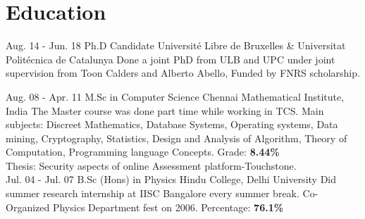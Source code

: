 \documentclass[]{cv-class}
\begin{document}
\section{Education}
\begin{entrylist}
  \entry
    {Aug. 14 - Jun. 18}
    {Ph.D Candidate}
    {Universit\'{e} Libre de Bruxelles \&  Universitat Polit\'{e}cnica de Catalunya}
   {Done a joint PhD from ULB and UPC under joint supervision from Toon Calders and Alberto Abello, Funded by FNRS scholarship.\\}

  \entry
    {Aug. 08 - Apr. 11}
    {M.Sc in Computer Science}
    {Chennai Mathematical Institute, India}
    {The Master course was done part time while working in TCS.
    Main subjects: Discreet Mathematics, Database Systems, Operating systems, Data mining, Cryptography, Statistics, Design and Analysis of Algorithm,
    Theory of Computation, Programming language Concepts. Grade: \textbf{8.44\%}\\
    Thesis: Security aspects of online Assessment platform-Touchstone.\\}
      \entry
    {Jul. 04 - Jul. 07}
    {B.Sc (Hons) in Physics}
    {Hindu College, Delhi University}
    {Did summer research internship at IISC Bangalore every summer break. Co-Organized Physics Department fest on 2006.
     Percentage: \textbf{76.1\%}\\}
\end{entrylist}
\end{document}
